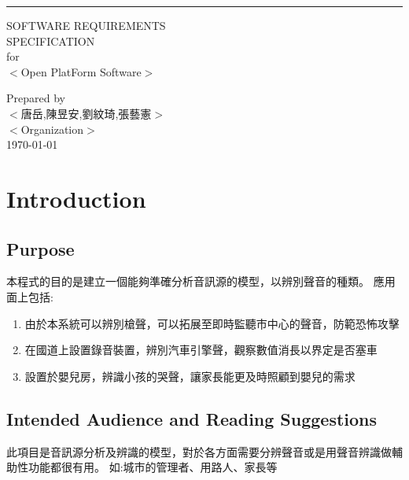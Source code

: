 \documentclass{scrreprt}
\date{}
\begin{document}
\renewcommand\arraystretch{2}
\begin{CJK*}{UTF8}{bsmi}
		

\begin{flushright}
    \rule{16cm}{5pt}\vskip1cm
    \begin{bfseries}
        \Huge{SOFTWARE REQUIREMENTS\\ SPECIFICATION}\\
        \vspace{1.5cm}
        for\\
        \vspace{1.5cm}
        $<$Open PlatForm Software$>$\\
        \vspace{1.5cm}
	
        Prepared by \\
  \vspace{1.5cm}
$<$唐岳,陳昱安,劉紋琦,張藝憲$>$\\
        \vspace{1.5cm}
        $<$Organization$>$\\
        \vspace{1.5cm}
        \today\\
    \end{bfseries}
\end{flushright}

\tableofcontents

\chapter{Introduction}

\section{Purpose}
本程式的目的是建立一個能夠準確分析音訊源的模型，以辨別聲音的種類。 應用面上包括:
\begin{enumerate}
\item 由於本系統可以辨別槍聲，可以拓展至即時監聽市中心的聲音，防範恐怖攻擊
\item 在國道上設置錄音裝置，辨別汽車引擎聲，觀察數值消長以界定是否塞車
\item 設置於嬰兒房，辨識小孩的哭聲，讓家長能更及時照顧到嬰兒的需求
\end{enumerate}
\section{Intended Audience and Reading Suggestions}
此項目是音訊源分析及辨識的模型，對於各方面需要分辨聲音或是用聲音辨識做輔助性功能都很有用。 如:城市的管理者、用路人、家長等


\end{CJK*}
\end{document}
